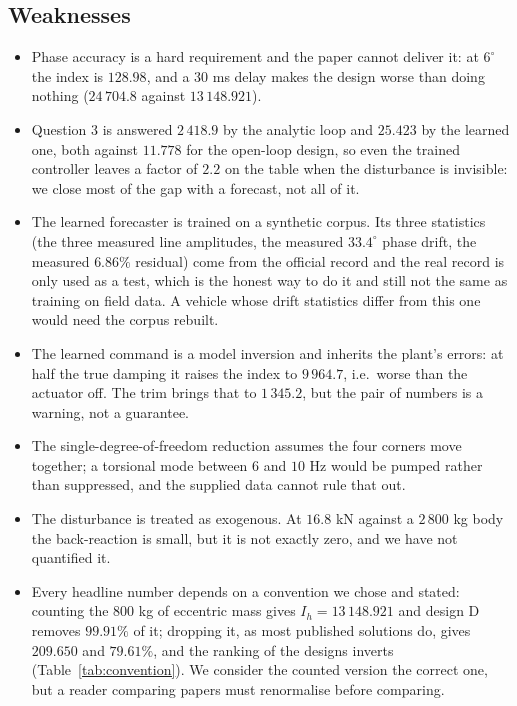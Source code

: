 \documentclass[12pt]{apmcmthesis}
\begin{document}
\subsection{Weaknesses}
\begin{itemize}
  \item Phase accuracy is a hard requirement and the paper cannot deliver it: at $6^\circ$ the
  index is $128.98$, and a $30$ ms delay makes the design worse than doing nothing
  ($24\,704.8$ against $13\,148.921$).
  \item Question 3 is answered $2\,418.9$ by the analytic loop and $25.423$ by the learned one, both
  against $11.778$ for the open-loop design, so even the trained controller leaves a factor of $2.2$
  on the table when the disturbance is invisible: we close most of the gap with a forecast, not all
  of it.
  \item The learned forecaster is trained on a synthetic corpus. Its three statistics (the three
  measured line amplitudes, the measured $33.4^\circ$ phase drift, the measured $6.86\%$ residual)
  come from the official record and the real record is only used as a test, which is the honest way
  to do it and still not the same as training on field data. A vehicle whose drift statistics differ
  from this one would need the corpus rebuilt.
  \item The learned command is a model inversion and inherits the plant's errors: at half the true
  damping it raises the index to $9\,964.7$, i.e.\ worse than the actuator off. The trim brings
  that to $1\,345.2$, but the pair of numbers is a warning, not a guarantee.
  \item The single-degree-of-freedom reduction assumes the four corners move together; a
  torsional mode between $6$ and $10$ Hz would be pumped rather than suppressed, and the supplied
  data cannot rule that out.
  \item The disturbance is treated as exogenous. At $16.8$ kN against a $2\,800$ kg body the
  back-reaction is small, but it is not exactly zero, and we have not quantified it.
  \item Every headline number depends on a convention we chose and stated: counting the $800$ kg of
  eccentric mass gives $I_h=13\,148.921$ and design D removes $99.91\%$ of it; dropping it, as most
  published solutions do, gives $209.650$ and $79.61\%$, and the ranking of the designs inverts
  (Table~\ref{tab:convention}). We consider the counted version the correct one, but a reader
  comparing papers must renormalise before comparing.
\end{itemize}
\end{document}
